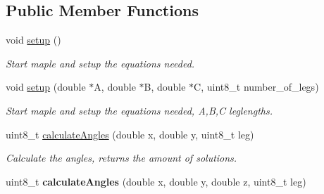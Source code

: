\subsection*{Public Member Functions}
\begin{DoxyCompactItemize}
\item 
\hypertarget{class_c_pos_calc_a5ca02546e5e3b789235d7c5fe41c4333}{
void \hyperlink{class_c_pos_calc_a5ca02546e5e3b789235d7c5fe41c4333}{setup} ()}
\label{class_c_pos_calc_a5ca02546e5e3b789235d7c5fe41c4333}

\begin{DoxyCompactList}\small\item\em Start maple and setup the equations needed. \item\end{DoxyCompactList}\item 
\hypertarget{class_c_pos_calc_a2812aeb0ba09da0b03466878b22544e5}{
void \hyperlink{class_c_pos_calc_a2812aeb0ba09da0b03466878b22544e5}{setup} (double $\ast$A, double $\ast$B, double $\ast$C, uint8\_\-t number\_\-of\_\-legs)}
\label{class_c_pos_calc_a2812aeb0ba09da0b03466878b22544e5}

\begin{DoxyCompactList}\small\item\em Start maple and setup the equations needed, A,B,C leglengths. \item\end{DoxyCompactList}\item 
\hypertarget{class_c_pos_calc_a1cf668374c1c6f0cfe0d04e2f2f39d67}{
uint8\_\-t \hyperlink{class_c_pos_calc_a1cf668374c1c6f0cfe0d04e2f2f39d67}{calculateAngles} (double x, double y, uint8\_\-t leg)}
\label{class_c_pos_calc_a1cf668374c1c6f0cfe0d04e2f2f39d67}

\begin{DoxyCompactList}\small\item\em Calculate the angles, returns the amount of solutions. \item\end{DoxyCompactList}\item 
\hypertarget{class_c_pos_calc_a40d5a111d816a379a4cdeceb346e41c9}{
uint8\_\-t {\bfseries calculateAngles} (double x, double y, double z, uint8\_\-t leg)}
\label{class_c_pos_calc_a40d5a111d816a379a4cdeceb346e41c9}

\end{DoxyCompactItemize}
